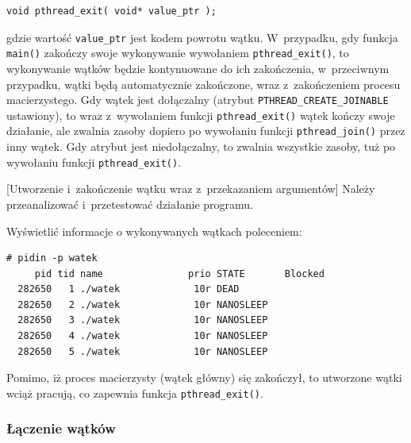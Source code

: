 \begin{lstlisting}[style=MyCStyle]
void pthread_exit( void* value_ptr );
\end{lstlisting}

gdzie wartość \lstinline[style=MyCStyle]{value_ptr} jest kodem powrotu wątku. W~przypadku, gdy funkcja \lstinline[style=MyCStyle]{main()} zakończy swoje wykonywanie wywołaniem \lstinline[style=MyCStyle]{pthread_exit()}, to wykonywanie wątków będzie kontynuowane do ich zakończenia, w~przeciwnym przypadku, wątki będą automatycznie zakończone, wraz z~zakończeniem procesu macierzystego. Gdy wątek jest dołączalny (atrybut \lstinline[style=MyCStyle]{PTHREAD_CREATE_JOINABLE} ustawiony), to wraz z~wywołaniem funkcji \lstinline[style=MyCStyle]{pthread_exit()} wątek kończy swoje działanie, ale zwalnia zasoby dopiero po wywołaniu funkcji \lstinline[style=MyCStyle]{pthread_join()} przez inny wątek. Gdy atrybut jest niedołączalny, to zwalnia wszystkie zasoby, tuż po wywołaniu funkcji  \lstinline[style=MyCStyle]{pthread_exit()}. 


\begin{example}{[Utworzenie i~zakończenie wątku wraz z~przekazaniem argumentów]}
Należy przeanalizować i~przetestować działanie programu. 




Wyświetlić informacje o wykonywanych wątkach poleceniem: 

\begin{lstlisting}[style=MyCStyle]
# pidin -p watek
     pid tid name               prio STATE       Blocked                     
  282650   1 ./watek             10r DEAD                                    
  282650   2 ./watek             10r NANOSLEEP                               
  282650   3 ./watek             10r NANOSLEEP                               
  282650   4 ./watek             10r NANOSLEEP                               
  282650   5 ./watek             10r NANOSLEEP                               
\end{lstlisting}

Pomimo, iż proces macierzysty (wątek główny) się zakończył, to utworzone wątki wciąż pracują, co zapewnia funkcja  \lstinline[style=MyCStyle]{pthread_exit()}.
\end{example} 

\subsubsection{Łączenie wątków}

